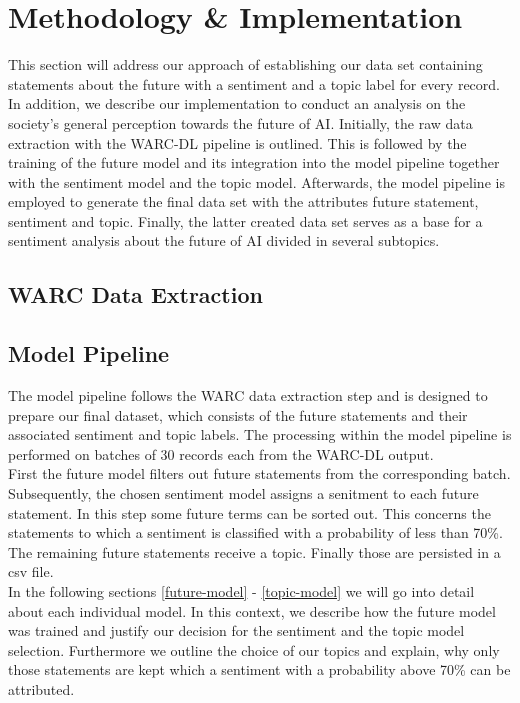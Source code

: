 \section{Methodology \& Implementation}

This section will address our approach of establishing our data set containing statements about the future with a sentiment and a topic label for every record.
In addition, we describe our implementation to conduct an analysis on the society's general perception towards the future of AI.
Initially, the raw data extraction with the WARC-DL pipeline \citep{Deckers2022} is outlined.
This is followed by the training of the future model and its integration into the model pipeline together with the sentiment model and the topic model.
Afterwards, the model pipeline is employed to generate the final data set with the attributes future statement, sentiment and topic.
Finally, the latter created data set serves as a base for a sentiment analysis about the future of AI divided in several subtopics.

\subsection{WARC Data Extraction}

\subsection {Model Pipeline}
The model pipeline follows the WARC data extraction step and is designed to prepare our final dataset, which consists of the future statements and their associated sentiment and topic labels.
The processing within the model pipeline is performed on batches of 30 records each from the WARC-DL output.
\\
First the future model filters out future statements from the corresponding batch.
Subsequently, the chosen sentiment model assigns a senitment to each future statement.
In this step some future terms can be sorted out.
This concerns the statements to which a sentiment is classified with a probability of less than 70\%.
The remaining future statements receive a topic.
Finally those are persisted in a csv file.
\\
In the following sections \ref{future-model} - \ref{topic-model} we will go into detail about each individual model.
In this context, we describe how the future model was trained and justify our decision for the sentiment and the topic model selection.
Furthermore we outline the choice of our topics and explain, why only those statements are kept which a sentiment with a probability above 70\% can be attributed.

